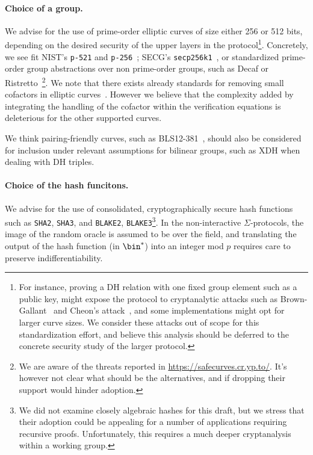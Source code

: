 \documentclass[runningheads]{llncs}
\begin{document}
\paragraph{Choice of a group.} We advise for the use of prime-order elliptic curves of size either 256 or 512 bits, depending on the desired security of the upper layers in the protocol\footnote{For instance, proving a DH relation with one fixed group element such as a public key, might expose the protocol to cryptanalytic attacks such as Brown-Gallant~\cite{EPRINT:BroGal04} and Cheon’s attack~\cite{EC:Cheon06}, and some implementations might opt for larger curve sizes. We consider these attacks out of scope for this standardization effort, and believe this analysis should be deferred to the concrete security study of the larger protocol.}.
Concretely, we see fit NIST's \verb|p-521| and \verb|p-256|~\cite{fips2}; SECG's \verb|secp256k1|~\cite{SECG}, or standardized prime-order group abstractions over non prime-order groups, such as Decaf or Ristretto~\cite{C:Hamburg15,cfrg-ristretto-decaf}\footnote{We are aware of the threats reported in
\url{https://safecurves.cr.yp.to/}.
It's however not clear what should be the alternatives, and if dropping their support would hinder adoption.
}.
We note that there exists already standards for removing small cofactors in elliptic curves~\cite{rfc2785}.
However we believe that the complexity added by integrating the handling of the cofactor within the verification equations is deleterious for the other supported curves.

We think pairing-friendly curves, such as BLS12-381~\cite{bls12}, should also be considered for inclusion under relevant assumptions for bilinear groups, such as XDH when dealing with DH triples.



 \paragraph{Choice of the hash funcitons.} We advise for the use of consolidated, cryptographically secure hash functions such as \verb|SHA2|, \verb|SHA3|, and \verb|BLAKE2|, \verb|BLAKE3|\footnote{We did not examine closely algebraic hashes for this draft, but we stress that their adoption could be appealing for a number of applications requiring recursive proofs. Unfortunately, this requires a much deeper cryptanalysis within a working group.}.
 In the non-interactive $\Sigma$-protocols, the image of the random oracle is assumed to be over the field, and translating the output of the hash function (in $\bin^*$) into an integer mod $p$ requires care to preserve indifferentiability.
\end{document}
